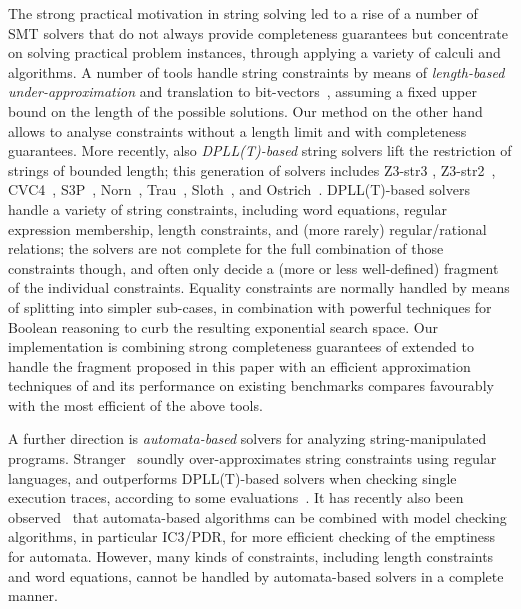 \documentclass[sigplan,review,anonymous]{acmart}\settopmatter{printfolios=true,printccs=false,printacmref=false}
\begin{document}
The strong practical motivation in string solving led to a rise of a number of SMT solvers that do not always provide completeness guarantees but concentrate on solving practical problem instances, 
through applying a variety of calculi and algorithms.
%
A number of tools handle string constraints by means of {\it length-based under-approximation} and
translation to
bit-vectors~\cite{Kiezun09hampi,Saxena10:kaluza,saxena:flax}, assuming
a fixed upper bound on the length of the possible solutions. 
%
Our method on the other hand allows to analyse constraints without a length limit and with completeness guarantees.
%
More recently, also {\it DPLL(T)-based} string solvers lift the
restriction of strings of bounded length; this generation of solvers
includes Z3-str3 \cite{Berzish2017Z3str3AS}, Z3-str2~\cite{Zheng13z3str}, 
CVC4~\cite{LiaEtAl-CAV-14}, S3P~\cite{trinh2014:s3,Trinh2016},
Norn~\cite{norn15}, 
Trau~\cite{trau18}, 
Sloth~\cite{sloth}, 
and 
Ostrich~\cite{Chen:2019}. DPLL(T)-based solvers
handle a variety of string constraints, including word equations, regular expression membership, length constraints, and (more rarely)
regular/rational relations; the solvers are not complete for the full
combination of those constraints though, and often only decide a (more
or less well-defined) fragment of the individual constraints. 
Equality constraints are normally handled by means of splitting into simpler
sub-cases, in combination with powerful techniques for Boolean
reasoning to curb the resulting exponential search space. 
%
Our implementation is combining strong completeness guarantees of \cite{sloth} extended to handle the fragment proposed in this paper with an efficient approximation techniques of \cite{trau18} 
and its performance on existing benchmarks compares favourably with the most efficient of the above tools.
%

A further direction is {\it automata-based} solvers for analyzing
string-manipulated programs. Stranger~\cite{fangyu:stranger} soundly
over-approximates string constraints using regular languages, and
outperforms DPLL(T)-based solvers when checking single execution
traces, according to some evaluations~\cite{KauslerS14}. It has
recently also been observed~\cite{DBLP:conf/cav/WangTLYJ16,sloth} that
automata-based algorithms can be combined with model checking
algorithms, in particular IC3/PDR, for more efficient checking of the emptiness for automata. However, many kinds of constraints, including length
constraints and word equations, cannot be
handled by automata-based solvers in a complete manner. 








\end{document}
